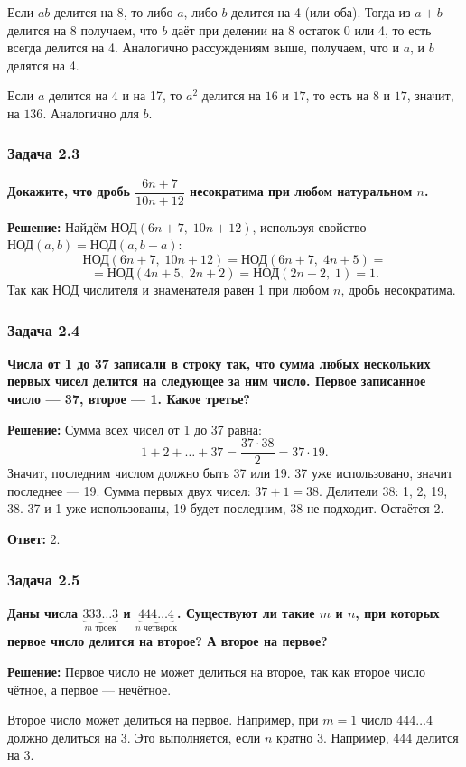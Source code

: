 \documentclass[12pt, a4paper]{article}
\begin{document}
Если $ab$ делится на 8, то либо $a$, либо $b$ делится на 4 (или оба). Тогда из $a+b$ делится на 8 получаем, что $b$ даёт при делении на 8 остаток 0 или 4, то есть всегда делится на 4. Аналогично рассуждениям выше, получаем, что и $a$, и $b$ делятся на 4.

Если $a$ делится на 4 и на 17, то $a^2$ делится на $16$ и $17$, то есть на $8$ и $17$, значит, на $136$. Аналогично для $b$.

\subsubsection*{Задача 2.3}
\textbf{Докажите, что дробь $\dfrac{6n+7}{10n+12}$ несократима при любом натуральном $n$.}

\textbf{Решение:}
Найдём $\text{НОД}(6n+7,\; 10n+12)$, используя свойство $\text{НОД}(a,b) = \text{НОД}(a, b-a)$:
\[
\text{НОД}(6n+7,\; 10n+12) = \text{НОД}(6n+7,\; 4n+5) =
\]
\[
= \text{НОД}(4n+5,\; 2n+2) = \text{НОД}(2n+2,\; 1) = 1.
\]
Так как НОД числителя и знаменателя равен 1 при любом $n$, дробь несократима.

\subsubsection*{Задача 2.4}
\textbf{Числа от 1 до 37 записали в строку так, что сумма любых нескольких первых чисел делится на следующее за ним число. Первое записанное число — 37, второе — 1. Какое третье?}

\textbf{Решение:}
Сумма всех чисел от 1 до 37 равна:
\[
1 + 2 + \dots + 37 = \frac{37 \cdot 38}{2} = 37 \cdot 19.
\]
Значит, последним числом должно быть 37 или 19. 37 уже использовано, значит последнее — 19. Сумма первых двух чисел: $37 + 1 = 38$. Делители 38: 1, 2, 19, 38. 37 и 1 уже использованы, 19 будет последним, 38 не подходит. Остаётся 2.

\textbf{Ответ:} 2.

\subsubsection*{Задача 2.5}
\textbf{Даны числа $\underbrace{333\ldots3}_{m\text{ троек}}$ и $\underbrace{444\ldots4}_{n\text{ четверок}}$. Существуют ли такие $m$ и $n$, при которых первое число делится на второе? А второе на первое?}

\textbf{Решение:}
Первое число не может делиться на второе, так как второе число чётное, а первое — нечётное.

Второе число может делиться на первое. Например, при $m=1$ число $444\ldots4$ должно делиться на 3. Это выполняется, если $n$ кратно 3. Например, $444$ делится на $3$.
\end{document}
